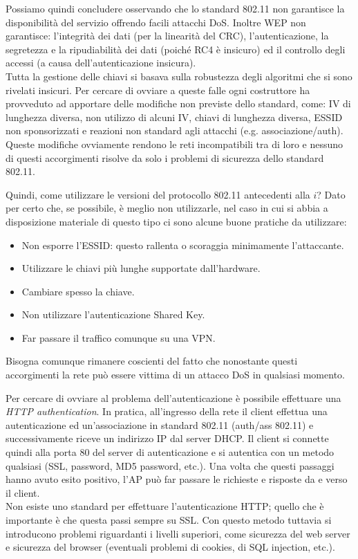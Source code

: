 Possiamo quindi concludere osservando che lo standard 802.11 non garantisce la disponibilità del servizio offrendo facili attacchi DoS. Inoltre WEP non garantisce: l'integrità dei dati (per la linearità del CRC), l'autenticazione, la segretezza e la ripudiabilità dei dati (poiché RC4 è insicuro) ed il controllo degli accessi (a causa dell'autenticazione insicura).\\
Tutta la gestione delle chiavi si basava sulla robustezza degli algoritmi che si sono rivelati insicuri. Per cercare di ovviare a queste falle ogni costruttore ha provveduto ad apportare delle modifiche non previste dello standard, come: IV di lunghezza diversa, non utilizzo di alcuni IV, chiavi di lunghezza diversa, ESSID non sponsorizzati e reazioni non standard agli attacchi (e.g. associazione/auth). Queste modifiche ovviamente rendono le reti incompatibili tra di loro e nessuno di questi accorgimenti risolve da solo i problemi di sicurezza dello standard 802.11.

Quindi, come utilizzare le versioni del protocollo 802.11 antecedenti alla $i$? Dato per certo che, se possibile, è meglio non utilizzarle, nel caso in cui si abbia a disposizione materiale di questo tipo ci sono alcune buone pratiche da utilizzare:
\begin{itemize}
	\item Non esporre l'ESSID: questo rallenta o scoraggia minimamente l'attaccante.
	\item Utilizzare le chiavi più lunghe supportate dall'hardware.
	\item Cambiare spesso la chiave.
	\item Non utilizzare l'autenticazione Shared Key.
	\item Far passare il traffico comunque su una VPN.
\end{itemize}
Bisogna comunque rimanere coscienti del fatto che nonostante questi accorgimenti la rete può essere vittima di un attacco DoS in qualsiasi momento.

Per cercare di ovviare al problema dell'autenticazione è possibile effettuare una \textit{HTTP authentication}. In pratica, all'ingresso della rete il client effettua una autenticazione ed un'associazione in standard 802.11 (auth/ass 802.11) e successivamente riceve un indirizzo IP dal server DHCP. Il client si connette quindi alla porta 80 del server di autenticazione e si autentica con un metodo qualsiasi (SSL, password, MD5 password, etc.). Una volta che questi passaggi hanno avuto esito positivo, l'AP può far passare le richieste e risposte da e verso il client.\\
Non esiste uno standard per effettuare l'autenticazione HTTP; quello che è importante è che questa passi sempre su SSL. Con questo metodo tuttavia si introducono problemi riguardanti i livelli superiori, come sicurezza del web server e sicurezza del browser (eventuali problemi di cookies, di SQL injection, etc.).

